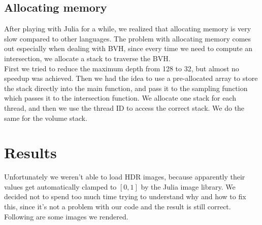 \documentclass[12pt]{report}
\begin{document}
    \subsection*{Allocating memory}\label{subsec:optimizations-allocating-memory}
    After playing with Julia for a while, we realized that allocating memory is very slow compared to other languages.
    The problem with allocating memory comes out especially when dealing with BVH, since every time we need to compute
    an intersection, we allocate a stack to traverse the BVH\@.\\
    First we tried to reduce the maximum depth from 128 to 32, but almost no speedup was achieved.
    Then we had the idea to use a pre-allocated array to store the stack directly into the main function, and pass it to the
    sampling function which passes it to the intersection function.
    We allocate one stack for each thread, and then we use the thread ID to access the correct stack.
    We do the same for the volume stack.



    \section*{Results}\label{sec:results}
    Unfortunately we weren't able to load HDR images, because apparently their values get automatically clamped to
    $[0,1]$ by the Julia image library.
    We decided not to spend too much time trying to understand why and how to fix this, since it's not a problem with
    our code and the result is still correct.\\
    Following are some images we rendered.\\
\end{document}
